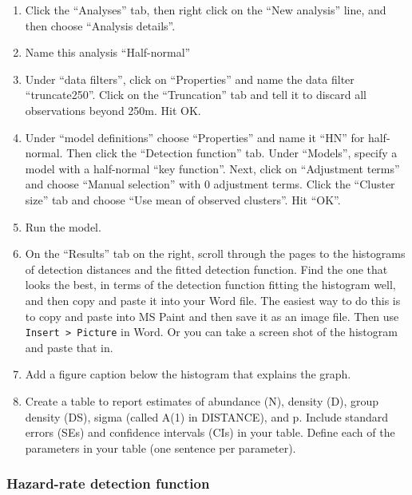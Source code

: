 \documentclass[12pt]{article}\usepackage[]{graphicx}\usepackage[]{color}
\begin{document}
\begin{enumerate}
  \item Click the ``Analyses'' tab, then right click on the ``New 
    analysis'' line, and then choose ``Analysis details''.  
  \item Name this analysis ``Half-normal''
  \item Under ``data filters'', click on ``Properties'' and
    name the data filter ``truncate250''. Click on the ``Truncation''
    tab and tell it to discard all observations beyond 250m. Hit
    OK. 
  \item Under ``model definitions'' choose ``Properties'' and
    name it ``HN'' for half-normal. Then click the ``Detection
    function'' tab. Under ``Models'', specify a model with a
    half-normal ``key function''. Next, click on ``Adjustment terms''
    and choose ``Manual selection'' with 0 adjustment terms. Click the
    ``Cluster size'' tab and choose ``Use mean of observed
    clusters''. Hit ``OK''. 
  \item Run the model.
  \item On the ``Results'' tab on the right, scroll through the
    pages to the histograms of detection distances and the fitted
    detection function. Find the one that looks the best, in terms of
    the detection function fitting the histogram well, and then copy
    and paste it into your Word file. The easiest way to do this is to
    copy and paste into MS Paint and then save it as an image
    file. Then use \verb+Insert > Picture+ in Word.  Or you can take a
    screen shot of the histogram and paste that in. 
  \item Add a figure caption below the histogram that explains
    the graph.   
  \item Create a table to report estimates of abundance (N), density
    (D), group density (DS), sigma (called A(1) in DISTANCE), and
    p. Include standard errors (SEs) and confidence intervals (CIs) in
    your table. Define each of the parameters in your table (one sentence per parameter). 
\end{enumerate}


\subsubsection*{\normalsize Hazard-rate detection function}
\end{document}

